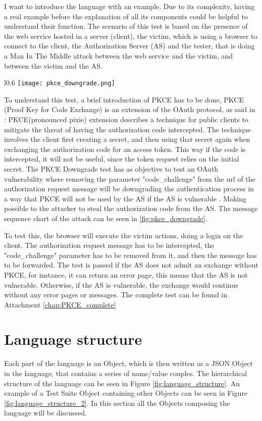 I want to introduce the language with an example. Due to its complexity, having a real example before the explanation of all its components could be helpful to understand their function.
The scenario of this test is based on the presence of the web service hosted in a server (client), the victim, which is using a browser to connect to the client, the Authorization Server (AS) and the tester, that is doing a Man In The Middle attack between the web service and the victim, and between the victim and the AS.
\begin{wrapfigure}{l}{0.6\textwidth}
    \texttt{[image: pkce\_downgrade.png]}
    \caption{PKCE Downgrade}
    \label{fig:pkce_downgrade}
\end{wrapfigure}
To understand this test, a brief introduction of PKCE has to be done, PKCE (Proof Key for Code Exchange) is an extension of the \gls{OAuth} protocol, as said in \cite{pkce_explanation}: PKCE(pronounced pixie) extension describes a technique for public clients to mitigate the threat of having the authorization code intercepted. The technique involves the client first creating a secret, and then using that secret again when exchanging the authorization code for an access token. This way if the code is intercepted, it will not be useful, since the token request relies on the initial secret. 
The PKCE Downgrade test has as objective to test an \Gls{OAuth} vulnerability where removing the parameter "code\_challenge" from the url of the authorization request message will be downgrading the authentication process in a way that PKCE will not be used by the AS if the AS is vulnerable \cite{pkce_downgrade}. Making possible to the attacker to steal the authorization code from the AS. The message sequence chart of the attack can be seen in \ref{fig:pkce_downgrade}.

To test this, the browser will execute the victim actions, doing a login on the client. The authorization request message has to be intercepted, the "code\_challenge" parameter has to be removed from it, and then the message has to be forwarded. The test is passed if the AS does not admit an exchange without PKCE, for instance, it can return an error page, this means that the AS is not vulnerable. Otherwise, if the AS is vulnerable, the exchange would continue without any error pages or messages.
The complete test can be found in Attachment \ref{chap:PKCE_complete}

\section{Language structure}
Each part of the language is an Object, which is then written as a JSON Object in the language, that contains a series of name/value couples. The hierarchical structure of the language can be seen in Figure \ref{fig:language_structure}. An example of a Test Suite Object containing other Objects can be seen in Figure \ref{fig:language_structure_2}. In this section all the Objects composing the language will be discussed.

